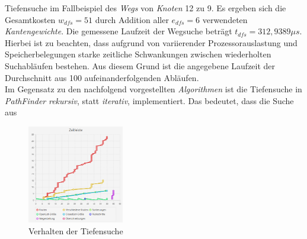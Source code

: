 \documentclass[12pt]{article}
\begin{document}
\noindent Tiefensuche im Fallbeispiel des \textit{Wegs} von \textit{Knoten} 12 zu 9. Es ergeben sich die Gesamtkosten $w_{dfs} = 51$ durch Addition aller $e_{dfs} = 6$ verwendeten \textit{Kantengewichte}. Die gemessene Laufzeit der Wegsuche beträgt $t_{dfs} = 312,9389\mu s$. Hierbei ist zu beachten, dass aufgrund von variierender Prozessorauslastung und Speicherbelegungen starke zeitliche Schwankungen zwischen wiederholten Suchabläufen bestehen. Aus diesem Grund ist die angegebene Laufzeit der Durchschnitt aus 100 aufeinanderfolgenden Abläufen.
\\
Im Gegensatz zu den nachfolgend vorgestellten \textit{Algorithmen} ist die Tiefensuche in \textit{PathFinder} \textit{rekursiv}, statt \textit{iterativ}, implementiert. Das bedeutet, dass die Suche aus
\begin{figure}
\vspace{-20pt}
\begin{center}
\includegraphics[width=0.375\textwidth]{res/dfs_time.png}
\end{center}
\vspace{-30pt}
\centering
\caption{Verhalten der Tiefensuche}
\label{fig:dfs-time}
\end{figure}
\end{document}
